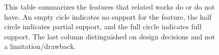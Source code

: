 \begin{figure}[H]
\centering 
\begin{table}[H]
	\vspace{-2em}
\end{table}
\vspace{-1em}
\caption{This table summarizes the features that related works do or do not have. An empty cicle \emptycirc[0.5ex] indicates no support for the feature, the half circle \halfcircleft[0.5ex] indicates partial support, and the full circle \fullcirc[0.5ex] indicates full support. The last column distinguished on design decisions and not a limitation/drawback.}
\label{fig:relatedworks}
\end{figure}

